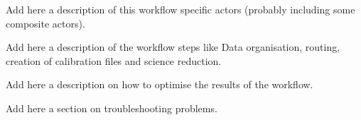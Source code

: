 \documentclass[pdftex,a4paper,twoside,11pt]{article}
\begin{document}
Add here a description of this workflow specific actors 
(probably including some composite actors).


Add here a description of the workflow steps like Data organisation,
routing, creation of calibration files and science reduction.

Add here a description on how to optimise the results of the workflow.



Add here a section on troubleshooting problems.


\end{document}
